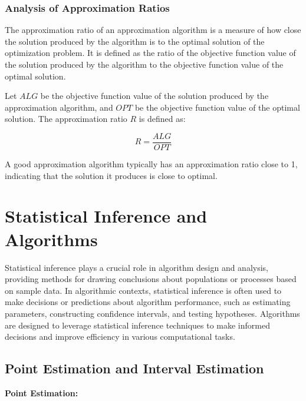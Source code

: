\documentclass[12pt]{book} %
\begin{document}
\subsubsection{Analysis of Approximation Ratios}
The approximation ratio of an approximation algorithm is a measure of how close the solution produced by the algorithm is to the optimal solution of the optimization problem. It is defined as the ratio of the objective function value of the solution produced by the algorithm to the objective function value of the optimal solution.

Let \(ALG\) be the objective function value of the solution produced by the approximation algorithm, and \(OPT\) be the objective function value of the optimal solution. The approximation ratio \(R\) is defined as:

\[ R = \frac{ALG}{OPT} \]

A good approximation algorithm typically has an approximation ratio close to 1, indicating that the solution it produces is close to optimal.


\section{Statistical Inference and Algorithms}
Statistical inference plays a crucial role in algorithm design and analysis, providing methods for drawing conclusions about populations or processes based on sample data. In algorithmic contexts, statistical inference is often used to make decisions or predictions about algorithm performance, such as estimating parameters, constructing confidence intervals, and testing hypotheses. Algorithms are designed to leverage statistical inference techniques to make informed decisions and improve efficiency in various computational tasks.

\subsection{Point Estimation and Interval Estimation}
\textbf{Point Estimation:}
\end{document}
